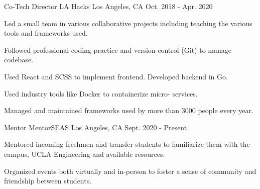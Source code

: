 \begin{cventries}

\cventry
    {Co-Tech Director} %
    {LA Hacks} %
    {Los Angeles, CA} %
    {Oct. 2018 - Apr. 2020} %
    {
      \begin{cvitems} %
        \item{Led a small team in various collaborative projects including teaching the various tools and frameworks used.}
        \item{Followed professional coding practice and version control (Git) to manage codebase.}
        \item{Used React and SCSS to implement frontend. Developed backend in Go.}
        \item{Used industry tools like Docker to containerize micro-
        services.}
        \item{Managed and maintained frameworks used by more than 3000 people every year.}
      \end{cvitems}
    }

  \cventry
    {Mentor} %
    {MentorSEAS} %
    {Los Angeles, CA} %
    {Sept. 2020 - Present} %
    {
      \begin{cvitems} %
        \item{Mentored incoming freshmen and transfer students to familiarize them with the campus, UCLA Engineering and available resources.}
        \item{Organized events both virtually and in-person to foster a sense of community and friendship between students.}
      \end{cvitems}
    }
\end{cventries}
